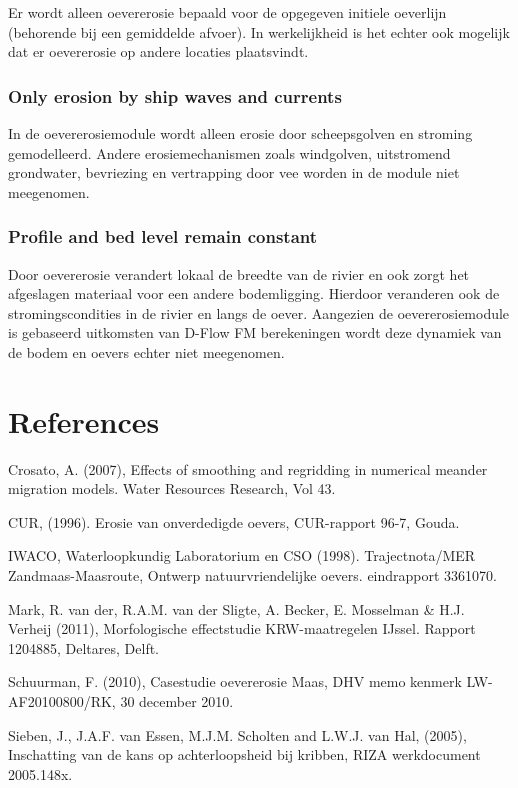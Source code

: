 Er wordt alleen oevererosie bepaald voor de opgegeven initiele oeverlijn (behorende bij een gemiddelde afvoer).
In werkelijkheid is het echter ook mogelijk dat er oevererosie op andere locaties plaatsvindt.

\subsection{Only erosion by ship waves and currents}

In de oevererosiemodule wordt alleen erosie door scheepsgolven en stroming gemodelleerd.
Andere erosiemechanismen zoals windgolven, uitstromend grondwater, bevriezing en vertrapping door vee worden in de module niet meegenomen.

\subsection{Profile and bed level remain constant}

Door oevererosie verandert lokaal de breedte van de rivier en ook zorgt het afgeslagen materiaal voor een andere bodemligging.
Hierdoor veranderen ook de stromingscondities in de rivier en langs de oever.
Aangezien de oevererosiemodule is gebaseerd uitkomsten van D-Flow FM berekeningen wordt deze dynamiek van de bodem en oevers echter niet meegenomen.

\chapter*{References}

Crosato, A. (2007), Effects of smoothing and regridding in numerical meander migration models. Water Resources Research, Vol 43.

CUR, (1996). Erosie van onverdedigde oevers, CUR-rapport 96-7, Gouda.

IWACO, Waterloopkundig Laboratorium en CSO (1998). Trajectnota/MER Zandmaas-Maasroute, Ontwerp natuurvriendelijke oevers. eindrapport 3361070.

Mark, R. van der, R.A.M. van der Sligte, A. Becker, E. Mosselman & H.J. Verheij (2011), Morfologische effectstudie KRW-maatregelen IJssel.
Rapport 1204885, Deltares, Delft.

Schuurman, F. (2010), Casestudie oevererosie Maas, DHV memo kenmerk LW-AF20100800/RK, 30 december 2010.

Sieben, J., J.A.F. van Essen, M.J.M. Scholten and L.W.J. van Hal, (2005), Inschatting van de kans op achterloopsheid bij kribben, RIZA werkdocument 2005.148x.

